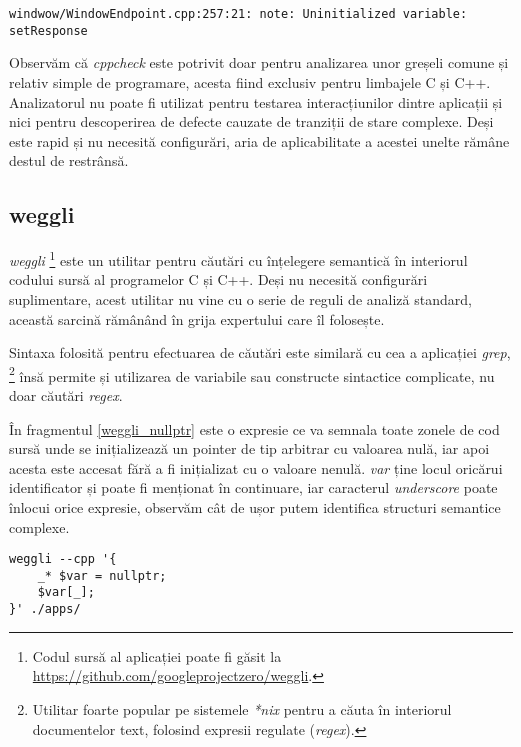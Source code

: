 \begin{lstlisting}[caption={Exemplu de fals pozitiv detectat de \textit{cppcheck}}, label={fals_pozitive_cppcheck}]
windwow/WindowEndpoint.cpp:257:21: note: Uninitialized variable: setResponse
\end{lstlisting}

Observăm că \textit{cppcheck} este potrivit doar pentru analizarea unor greșeli comune și relativ simple de programare, acesta fiind exclusiv pentru limbajele C și C++. Analizatorul nu poate fi utilizat pentru testarea interacțiunilor dintre aplicații și nici pentru descoperirea de defecte cauzate de tranziții de stare complexe. Deși este rapid și nu necesită configurări, aria de aplicabilitate a acestei unelte rămâne destul de restrânsă.

\subsection*{weggli}

\textit{weggli} \footnote{Codul sursă al aplicației poate fi găsit la \url{https://github.com/googleprojectzero/weggli}.} este un utilitar pentru căutări cu înțelegere semantică în interiorul codului sursă al programelor C și C++. Deși nu necesită configurări suplimentare, acest utilitar nu vine cu o serie de reguli de analiză standard, această sarcină rămânând în grija expertului care îl folosește.

Sintaxa folosită pentru efectuarea de căutări este similară cu cea a aplicației \textit{grep}, \footnote{Utilitar foarte popular pe sistemele \textit{*nix} pentru a căuta în interiorul documentelor text, folosind expresii regulate (\textit{regex}).} însă permite și utilizarea de variabile sau constructe sintactice complicate, nu doar căutări \textit{regex}.

În fragmentul \ref{weggli_nullptr} este o expresie ce va semnala toate zonele de cod sursă unde se inițializează un pointer de tip arbitrar cu valoarea nulă, iar apoi acesta este accesat fără a fi inițializat cu o valoare nenulă. \textit{var} ține locul oricărui identificator și poate fi menționat în continuare, iar caracterul \textit{underscore} poate înlocui orice expresie, observăm cât de ușor putem identifica structuri semantice complexe.

\begin{lstlisting}[label={weggli_nullptr}, caption={Interogare weggli pentru a găsi accesări de pointer nul}]
weggli --cpp '{
    _* $var = nullptr;
    $var[_];
}' ./apps/
\end{lstlisting}

